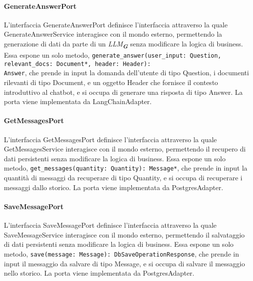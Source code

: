 \paragraph{GenerateAnswerPort}
\label{sec:generate_answer_port}
L'interfaccia GenerateAnswerPort definisce l'interfaccia attraverso la quale GenerateAnswerService interagisce con il mondo esterno, permettendo la generazione di dati da parte di un \emph{LLM}\textsubscript{\textbf{\textit{G}}} senza modificare la logica di business. Essa espone un solo metodo, \texttt{generate\_answer(user\_input: Question, relevant\_docs: Document*, header: Header):\\ Answer}, che prende in input la domanda dell'utente di tipo Question, i documenti rilevanti di tipo Document, e un oggetto Header che fornisce il contesto introduttivo al chatbot, e si occupa di generare una risposta di tipo Answer. La porta viene implementata da LangChainAdapter.

\paragraph{GetMessagesPort}
\label{sec:get_messages_port}
L'interfaccia GetMessagesPort definisce l'interfaccia attraverso la quale GetMessagesService interagisce con il mondo esterno, permettendo il recupero di dati persistenti senza modificare la logica di business. Essa espone un solo metodo, \texttt{get\_messages(quantity: Quantity): Message*}, che prende in input la quantità di messaggi da recuperare di tipo Quantity, e si occupa di recuperare i messaggi dallo storico. La porta viene implementata da PostgresAdapter.

\paragraph{SaveMessagePort}
\label{sec:save_message_port}
L'interfaccia SaveMessagePort definisce l'interfaccia attraverso la quale SaveMessageService interagisce con il mondo esterno, permettendo il salvataggio di dati persistenti senza modificare la logica di business. Essa espone un solo metodo, \texttt{save(message: Message): DbSaveOperationResponse}, che prende in input il messaggio da salvare di tipo Message, e si occupa di salvare il messaggio nello storico. La porta viene implementata da PostgresAdapter.


\label{sec:adapter}

